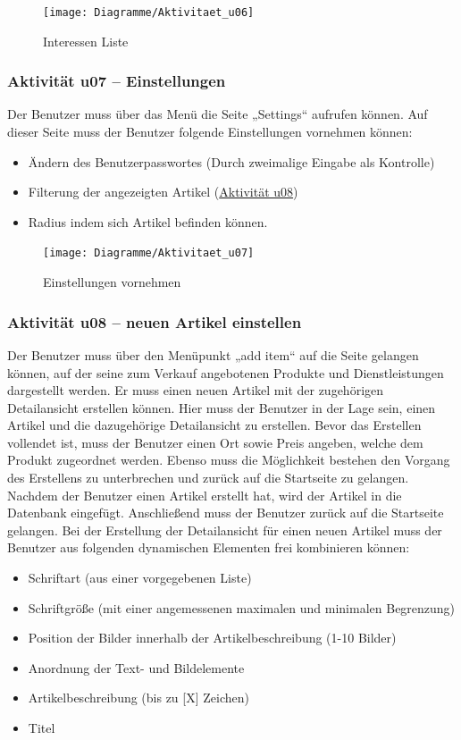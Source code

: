 \documentclass[a4paper,12pt,oneside]{scrartcl}
\begin{document}
\begin{figure}[!htbp]
\centering
\noindent\texttt{[image: Diagramme/Aktivitaet\_u06]}
\caption{Interessen Liste}
\end{figure}
\FloatBarrier


\subsubsection{Aktivität u07 – Einstellungen}
Der Benutzer muss über das Menü die Seite „Settings“ aufrufen können. Auf dieser Seite muss der Benutzer folgende Einstellungen vornehmen können:
\begin{itemize}
	\item Ändern des Benutzerpasswortes (Durch zweimalige Eingabe als Kontrolle)
	\item Filterung der angezeigten Artikel (\hyperlink{u08}{Aktivität u08})
	\item Radius indem sich Artikel befinden können.
\end{itemize}

\begin{figure}[!htbp]
\centering
\noindent\texttt{[image: Diagramme/Aktivitaet\_u07]}
\caption{Einstellungen vornehmen}
\end{figure}
\FloatBarrier


\hypertarget{u08}{\subsubsection{Aktivität u08 – neuen Artikel einstellen}}
Der Benutzer muss über den Menüpunkt „add item“ auf die Seite gelangen können, auf der seine zum Verkauf angebotenen Produkte und Dienstleistungen dargestellt werden. Er muss einen neuen Artikel mit der  zugehörigen Detailansicht erstellen können. Hier muss der Benutzer in der Lage sein, einen Artikel und die dazugehörige Detailansicht zu erstellen. Bevor das Erstellen vollendet ist, muss der Benutzer einen Ort sowie Preis angeben, welche dem Produkt zugeordnet werden. Ebenso muss die Möglichkeit bestehen den Vorgang des Erstellens zu unterbrechen und zurück auf die Startseite zu gelangen. Nachdem der Benutzer einen Artikel erstellt hat, wird der Artikel in die Datenbank eingefügt. Anschließend muss der Benutzer zurück auf die Startseite gelangen. 
Bei der Erstellung der Detailansicht für einen neuen Artikel muss der Benutzer aus folgenden dynamischen Elementen frei kombinieren können:
\begin{itemize}
	\item Schriftart (aus einer vorgegebenen Liste)
	\item Schriftgröße (mit einer angemessenen maximalen und minimalen Begrenzung)
	\item Position der Bilder innerhalb der Artikelbeschreibung (1-10 Bilder)
	\item Anordnung der Text- und Bildelemente
	\item Artikelbeschreibung (bis zu [X] Zeichen)
	\item Titel
\end{itemize}
\end{document}
